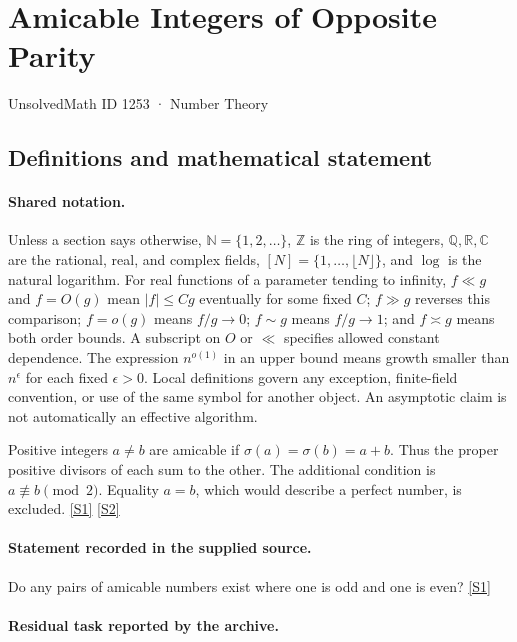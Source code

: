 \documentclass[11pt,a4paper]{article}
\newcommand{\N}{\mathbb{N}}
\newcommand{\Z}{\mathbb{Z}}
\newcommand{\Q}{\mathbb{Q}}
\newcommand{\R}{\mathbb{R}}
\newcommand{\C}{\mathbb{C}}
\newcommand{\sref}[2]{\hyperlink{source:#1:#2}{[S#2]}}
\begin{document}

\setcounter{section}{1252}

\section{Amicable Integers of Opposite Parity}\label{1253}

{\small\sffamily UnsolvedMath ID 1253 · Number Theory}

\subsection{Definitions and mathematical statement}

\paragraph{Shared notation.}Unless a section says otherwise, $\N=\{1,2,\ldots\}$,
$\Z$ is the ring of integers, $\Q,\R,\C$ are the rational, real, and complex
fields, $[N]=\{1,\ldots,\lfloor N\rfloor\}$, and $\log$ is the natural
logarithm. For real functions of a parameter tending to infinity,
$f\ll g$ and $f=O(g)$ mean $|f|\leq Cg$ eventually for some fixed $C$;
$f\gg g$ reverses this comparison; $f=o(g)$ means $f/g\to0$;
$f\sim g$ means $f/g\to1$; and $f\asymp g$ means both order bounds.
A subscript on $O$ or $\ll$ specifies allowed constant dependence.
The expression $n^{o(1)}$ in an upper bound means growth smaller than
$n^\epsilon$ for each fixed $\epsilon>0$. Local definitions govern any
exception, finite-field convention, or use of the same symbol for another
object. An asymptotic claim is not automatically an effective algorithm.



Positive integers $a\ne b$ are amicable if $\sigma(a)=\sigma(b)=a+b$. Thus the proper positive divisors of each sum to the other. The additional condition is $a\not\equiv b\pmod2$. Equality $a=b$, which would describe a perfect number, is excluded. \sref{1253}{1} \sref{1253}{2}

\paragraph{Statement recorded in the supplied source.}
Do any pairs of amicable numbers exist where one is odd and one is even? \sref{1253}{1}

\paragraph{Residual task reported by the archive.}
\end{document}
